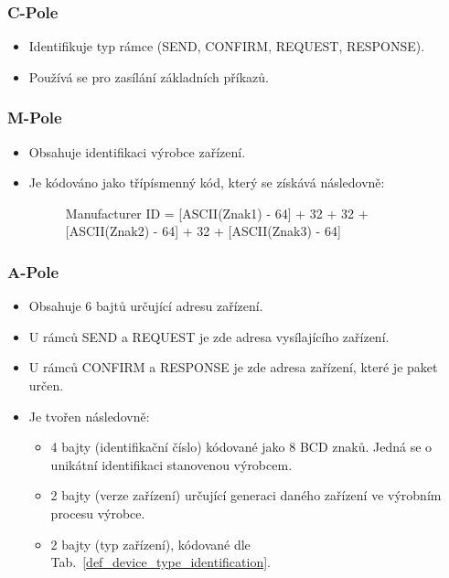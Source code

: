 \subsubsection{C-Pole}
\begin{itemize}
	\item Identifikuje typ rámce (SEND, CONFIRM, REQUEST, RESPONSE).
	\item Používá se pro zasílání základních příkazů.
\end{itemize}

\subsubsection{M-Pole}
\begin{itemize}
	\item Obsahuje identifikaci výrobce zařízení.
	\item Je kódováno jako třípísmenný kód, který se získává následovně:
			\begin{figure}[!ht]
				\begin{centerverbatim}
				Manufacturer ID = [ASCII(Znak1) - 64] + 32 + 32
												+ [ASCII(Znak2) - 64] + 32
												+ [ASCII(Znak3) - 64]
				\end{centerverbatim}
			\end{figure}
\end{itemize}
\vspace{-30pt}

\subsubsection{A-Pole}
\begin{itemize}
	\item Obsahuje 6 bajtů určující adresu zařízení.
	\item U rámců SEND a REQUEST je zde adresa vysílajícího zařízení.
	\item U rámců CONFIRM a RESPONSE je zde adresa zařízení, které je paket určen.
	\item Je tvořen následovně:
		\begin{itemize}
			\item 4 bajty (identifikační číslo) kódované jako 8 BCD znaků. Jedná se o unikátní identifikaci stanovenou výrobcem.
			\item 2 bajty (verze zařízení) určující generaci daného zařízení ve výrobním procesu výrobce.
			\item 2 bajty (typ zařízení), kódované dle Tab.~\ref{def_device_type_identification}.
		\end{itemize}
\end{itemize}

